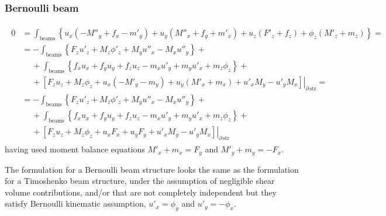 \documentclass[letterpaper,10pt,english]{jupyterBook}
\begin{document}
\subsubsection*{Bernoulli beam}
\begin{equation*}
\begin{split}\begin{aligned}
  0 & = \int_{\text{beams}} \left\{ u_x ( - M''_y + f_x - m'_y ) + u_y ( M''_x + f_y + m'_x ) + u_z ( F'_z + f_z ) + \phi_z ( M'_z + m_z )  \right\} = \\
    & = - \int_{\text{beams}} \left\{ F_z u'_z + M_z \phi'_z + M_y u''_x - M_x u''_y \right\} + \\
    & \quad \ + \int_{\text{beams}} \left\{ f_x u_x + f_y u_y + f_z u_z - m_x u'_y + m_y u'_x + m_z \phi_z \right\} + \\
    & \quad \ + \left. \left[ F_z u_z + M_z \phi_z + u_x \left( - M'_y - m_y \right) + u_y \left( M'_x + m_x \right) + u'_x M_y - u'_y M_x \right]\right|_{\partial \, \text{str}} = \\
    & = - \int_{\text{beams}} \left\{ F_z u'_z + M_z \phi'_z + M_y u''_x - M_x u''_y \right\} + \\
    & \quad \ + \int_{\text{beams}} \left\{ f_x u_x + f_y u_y + f_z u_z - m_x u'_y + m_y u'_x + m_z \phi_z \right\} + \\
    & \quad \ + \left. \left[ F_z u_z + M_z \phi_z + u_x F_x + u_y F_y + u'_x M_y - u'_y M_x \right]\right|_{\partial \, \text{str}}
\end{aligned}\end{split}
\end{equation*}
\sphinxAtStartPar
having used moment balance equations \(M'_x + m_x = F_y\) and \(M'_y + m_y = - F_x\).

\sphinxAtStartPar
{} The formulation for a Bernoulli beam structure looks the same as the formulation for a Timoshenko beam structure, under the assumption of negligible shear volume contributions, and/or that  are not completely independent but they satisfy Bernoulli kinematic assumption, \(u'_x = \phi_y\) and \(u'_y = - \phi_x\).
\end{document}
